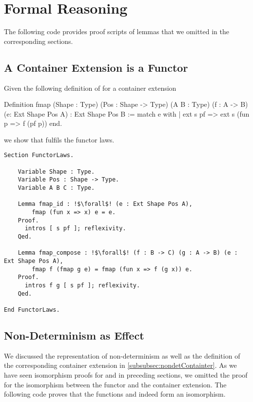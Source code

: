 \section{Formal Reasoning}

The following code provides proof scripts of lemmas that we omitted in the corresponding sections.

\subsection*{A Container Extension is a Functor}
\label{subsec:appendix:extFunctor}

Given the following definition of  for a container extension 

\begin{coqcode}
Definition fmap (Shape : Type) (Pos : Shape -> Type) (A B : Type)
    (f : A -> B) (e: Ext Shape Pos A) : Ext Shape Pos B :=
    match e with
    | ext s pf => ext s (fun p => f (pf p))
    end.
\end{coqcode}

we show that  fulfils the functor laws.

\begin{verbatim}
Section FunctorLaws.

    Variable Shape : Type.
    Variable Pos : Shape -> Type.
    Variable A B C : Type.

    Lemma fmap_id : !$\forall$! (e : Ext Shape Pos A),
        fmap (fun x => x) e = e.
    Proof.
      intros [ s pf ]; reflexivity.
    Qed.

    Lemma fmap_compose : !$\forall$! (f : B -> C) (g : A -> B) (e : Ext Shape Pos A),
        fmap f (fmap g e) = fmap (fun x => f (g x)) e.
    Proof.
      intros f g [ s pf ]; reflexivity.
    Qed.

End FunctorLaws.
\end{verbatim}

\subsection*{Non\--Determinism as Effect}
\label{subsec:appendix:nondet}

We discussed the representation of non\--determinism as well as the definition of the corresponding container extension in \autoref{subsubsec:nondetContainter}.
As we have seen isomorphism proofs for  and  in preceding sections, we omitted the proof for the isomorphism between the functor  and the container extension.
The following code proves that the functions  and  indeed form an isomorphism.

